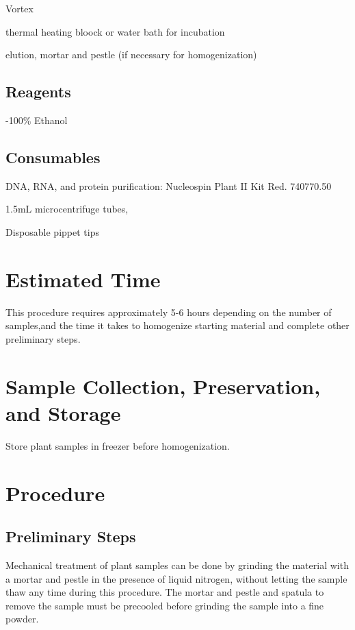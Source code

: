 \documentclass[12pt]{../SOP3_alpha}
\begin{document}
\NP Vortex

\NP thermal heating bloock or water bath for incubation

\NP elution, mortar and pestle (if necessary for homogenization)

\subsection*{Reagents}

-100\% Ethanol 

\subsection*{Consumables}

\NP DNA, RNA, and protein purification: Nucleospin Plant II Kit Red. 740770.50

\NP 1.5mL microcentrifuge tubes, 

\NP Disposable pippet tips


\section{Estimated Time}

\NP This procedure requires approximately 5-6 hours depending on the number of samples,and the time it takes to homogenize starting material and complete other preliminary steps. 

\section{Sample Collection, Preservation, and Storage}

\NP Store plant samples in freezer before homogenization.

\section{Procedure}

\subsection*{Preliminary Steps}
	 
\NP Mechanical treatment of plant samples can be done by grinding the material with a mortar and pestle in the presence of liquid nitrogen, without letting the sample thaw any time during this procedure. The mortar and pestle and spatula to remove the sample must be precooled before grinding the sample into a fine powder.
\end{document}
